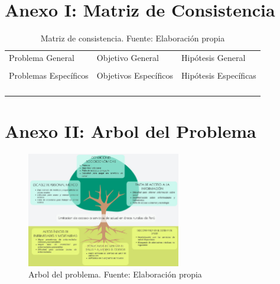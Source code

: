 \chapter{Anexo I: Matriz de Consistencia}


\begin{table}[h!]
	\centering
	\small
	\begin{tabular}{ |m{5cm}|m{5cm}|m{5cm}|  }
		\hline
		\rowcolor{bluejean}
		\Centering \color{white}{PROBLEMAS}& \Centering \color{white}{OBJETIVOS}& \Centering \color{white}{HIPÓTESIS}\\
		\hline
		\rowcolor{turq}
		\Centering Problema General& \Centering Objetivo General & \Centering Hipótesis General \\
		\hline
		{\ProblemaGeneral} & { \ObjetivoGeneral} & {\HipotesisGeneral} \\
		\hline
		\rowcolor{turq}
		\Centering Problemas Específicos& \Centering Objetivos Específicos & \Centering Hipótesis Específicas \\
		\hline
		{\Pbone} & {\Objone} & {\Hone} \\
		\hline
		{\Pbtwo} & {\Objtwo} & {\Htwo} \\
		\hline
		{\Pbthree} & {\Objthree} & {\Hthree} \\
		\hline
		{\Pbfour} & {\Objfour} & {\Hfour} \\
		\hline

	\end{tabular}
	\caption{Matriz de consistencia. Fuente: Elaboración propia}
	\label{1:table}
\end{table}



\chapter{Anexo II: Arbol del Problema}

\begin{figure}[h]
	\begin{center}
		\includegraphics[width=0.6\textwidth]{images_repo/Arbol del problema.jpeg}
		\caption{Arbol del problema. Fuente: Elaboración propia}
		\label{1:fig}
	\end{center}
\end{figure}

